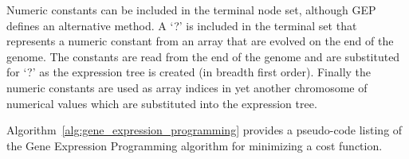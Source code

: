 \documentclass[a4paper, 11pt]{article}
\begin{document}
Numeric constants can be included in the terminal node set, although GEP defines an alternative method. A `?' is included in the terminal set that represents a numeric constant from an array that are evolved on the end of the genome. The constants are read from the end of the genome and are substituted for `?' as the expression tree is created (in breadth first order). Finally the numeric constants are used as array indices in yet another chromosome of numerical values which are substituted into the expression tree.

Algorithm~\ref{alg:gene_expression_programming} provides a pseudo-code listing of the Gene Expression Programming algorithm for minimizing a cost function. 

\begin{algorithm}[htp]
	\SetLine  

	
  

\end{algorithm}
\end{document}

